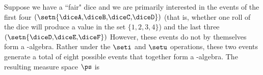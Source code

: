 \begin{example}
\label{ex:msr_dice}
Suppose we have a ``fair" dice and we are primarily interested in the
events of the first four 
$\left(\setn{\text{\diceA,\diceB,\diceC,\diceD}}\right)$
(that is, whether one roll of the dice will produce 
a value in the set $\{1,2,3,4\}$)
and the last three
$\left(\setn{\text{\diceD,\diceE,\diceF}}\right)$
However, these events do not by themselves form a \txsigma-algebra.
Rather under the $\seti$ and $\setu$ operations, these two events generate
a total of eight possible events that together form a \txsigma-algebra.
The resulting measure space $\ps$ is
\end{example}

